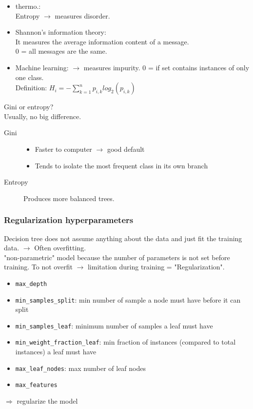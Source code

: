 \begin{itemize}
\item thermo.:\\
Entropy $\rightarrow$ measures disorder.

\item Shannon's information theory:\\
It measures the average information content of a message.\\
0 = all messages are the same.

\item Machine learning: $\rightarrow$ measures impurity.
0 = if set contains instances of only one class.\\
Definition: $H_i = -\sum_{k=1}^n p_{i,k} log_2(p_{i,k})$
\end{itemize}

Gini or entropy?\\
Usually, no big difference.
\begin{description}
    \item [Gini] \hfill
    \begin{itemize}
        \item Faster to computer $\rightarrow$ good default\\
        \item Tends to isolate the most frequent class in its own branch
    \end{itemize}
    \item [Entropy] \hfill
    Produces more balanced trees.
\end{description}

\subsubsection*{Regularization hyperparameters}
Decision tree does not assume anything about the data and just fit the training data.
$\rightarrow$ Often overfitting.\\

"non-parametric" model because the number of parameters is not set before training.
To not overfit $\rightarrow$ limitation during training = "Regularization".
\begin{itemize}
    \item \verb;max_depth;
    \item \verb;min_samples_split;: min number of sample a node must have before it can split
    \item \verb;min_samples_leaf;: minimum number of samples a leaf must have
    \item \verb;min_weight_fraction_leaf;: min fraction of instances (compared to total instances) a leaf must have
    \item \verb;max_leaf_nodes;: max number of leaf nodes
    \item \verb;max_features;
\end{itemize}
$\Rightarrow$ regularize the model

